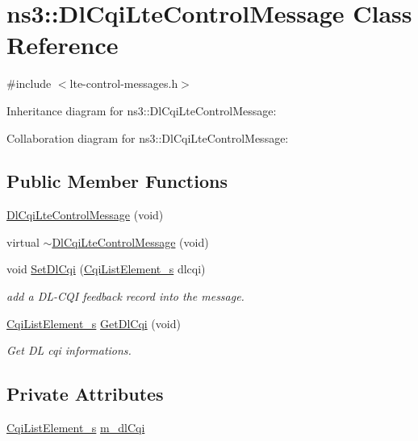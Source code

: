\hypertarget{classns3_1_1DlCqiLteControlMessage}{}\section{ns3\+:\+:Dl\+Cqi\+Lte\+Control\+Message Class Reference}
\label{classns3_1_1DlCqiLteControlMessage}


{\ttfamily \#include $<$lte-\/control-\/messages.\+h$>$}



Inheritance diagram for ns3\+:\+:Dl\+Cqi\+Lte\+Control\+Message\+:


Collaboration diagram for ns3\+:\+:Dl\+Cqi\+Lte\+Control\+Message\+:
\subsection*{Public Member Functions}
\begin{DoxyCompactItemize}
\item 
\hyperlink{classns3_1_1DlCqiLteControlMessage_a15ad0a37a7b982d99c94123855034e80}{Dl\+Cqi\+Lte\+Control\+Message} (void)
\item 
virtual \hyperlink{classns3_1_1DlCqiLteControlMessage_a71b1d0d8c6f2831a1795397cb0abb5ca}{$\sim$\+Dl\+Cqi\+Lte\+Control\+Message} (void)
\item 
void \hyperlink{classns3_1_1DlCqiLteControlMessage_aa300571617967cf7890a6173d596518c}{Set\+Dl\+Cqi} (\hyperlink{structns3_1_1CqiListElement__s}{Cqi\+List\+Element\+\_\+s} dlcqi)
\begin{DoxyCompactList}\small\item\em add a D\+L-\/\+C\+QI feedback record into the message. \end{DoxyCompactList}\item 
\hyperlink{structns3_1_1CqiListElement__s}{Cqi\+List\+Element\+\_\+s} \hyperlink{classns3_1_1DlCqiLteControlMessage_aedf7bdddc7664db34c9072c2adfdbdf7}{Get\+Dl\+Cqi} (void)
\begin{DoxyCompactList}\small\item\em Get DL cqi informations. \end{DoxyCompactList}\end{DoxyCompactItemize}
\subsection*{Private Attributes}
\begin{DoxyCompactItemize}
\item 
\hyperlink{structns3_1_1CqiListElement__s}{Cqi\+List\+Element\+\_\+s} \hyperlink{classns3_1_1DlCqiLteControlMessage_a514af9d935dac2a96780f6c5655040fd}{m\+\_\+dl\+Cqi}
\end{DoxyCompactItemize}
